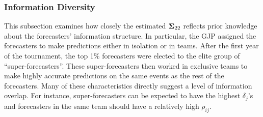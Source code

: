 \documentclass[11pt]{article}
\theoremstyle{definition}
\theoremstyle{definition}
\def\bSigma{{\bf \Sigma}}
\begin{document}
\subsubsection{Information Diversity}

This subsection examines how closely the estimated $\bSigma_{22}$ reflects prior knowledge about the forecasters' information structure. 
 In particular, the GJP assigned the forecasters to make predictions either in isolation or in teams. After the first year of the tournament, the top 1\% forecasters were elected to the elite group of ``super-forecasters''. These super-forecasters then worked in exclusive teams to make highly accurate predictions on the same events as the rest of the forecasters. Many of these characteristics directly suggest a level of information overlap. For instance, super-forecasters can be expected to have the highest $\delta_j$'s and forecasters in the same team should have a relatively high $\rho_{ij}$. 

\end{document}
